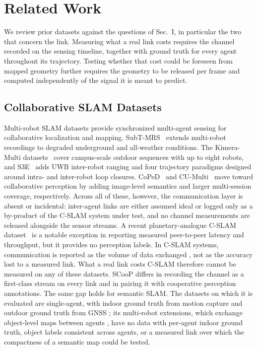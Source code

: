 \documentclass[journal]{IEEEtran}
\begin{document}
\section{Related Work}
\label{sec:related}
We review prior datasets against the questions of Sec.~I, in
particular the two that concern the link.
Measuring what a real link costs requires the channel recorded on the
sensing timeline, together with ground truth for every agent
throughout its trajectory. Testing whether that cost could be foreseen
from mapped geometry further requires the geometry to be released per
frame and computed independently of the signal it is meant to predict.

\subsection{Collaborative SLAM Datasets}
Multi-robot SLAM datasets provide synchronized multi-agent sensing for
collaborative localization and mapping.
SubT-MRS~\cite{subtmrs} extends multi-robot recordings to degraded
underground and all-weather conditions. The Kimera-Multi
datasets~\cite{kimeramulti} cover campus-scale outdoor sequences
with up to eight robots, and S3E~\cite{s3e} adds UWB inter-robot
ranging and four trajectory paradigms designed around intra- and
inter-robot loop closures. CoPeD~\cite{coped} and
CU-Multi~\cite{cumulti} move toward collaborative perception by
adding image-level semantics and larger multi-session coverage,
respectively. Across all of these, however, the communication layer
is absent or incidental: inter-agent links are either assumed ideal or
logged only as a by-product of the C-SLAM system under test, and no
channel measurements are released alongside the sensor streams. A
recent planetary-analogue C-SLAM dataset~\cite{planetary_cslam} is a
notable exception in reporting measured peer-to-peer latency and
throughput, but it provides no perception labels. In C-SLAM systems,
communication is reported as the volume of data exchanged
\cite{doorslam,swarmslam}, not as the accuracy lost to a measured
link. What a real link costs C-SLAM therefore cannot be measured on
any of these datasets. SCooP differs in recording the channel as a
first-class stream on every link and in pairing it with cooperative
perception annotations. The same gap holds for semantic SLAM. The
datasets on which it is evaluated are single-agent, with indoor ground
truth from motion capture and outdoor ground truth from GNSS
\cite{semslam_survey}; its multi-robot extensions, which exchange
object-level maps between agents \cite{kimeramulti}, have no data with
per-agent indoor ground truth, object labels consistent across agents,
or a measured link over which the compactness of a semantic map could
be tested.
\end{document}

